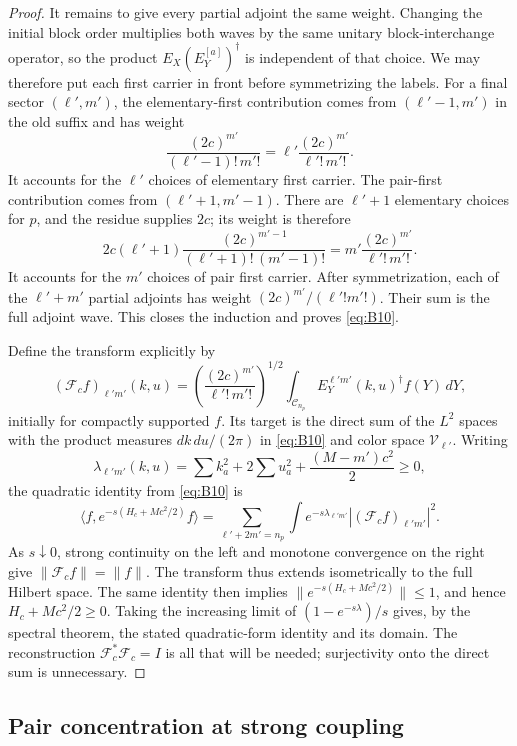 \begin{proof}
It remains to give every partial adjoint the same weight.  Changing
the initial block order multiplies both waves by the same unitary
block-interchange operator, so the product
\(E_X(E_Y^{[a]})^\dagger\) is independent of that choice.  We may
therefore put each first carrier in front before symmetrizing the
labels.  For a final sector \((\ell',m')\), the
elementary-first contribution comes from
\((\ell'-1,m')\) in the old suffix and has weight
\[
 \frac{(2c)^{m'}}{(\ell'-1)!\,m'!}
       =\ell'\frac{(2c)^{m'}}{\ell'!\,m'!}.
\]
It accounts for the \(\ell'\) choices of elementary first carrier.
The pair-first contribution comes from
\((\ell'+1,m'-1)\).  There are \(\ell'+1\) elementary choices
for \(p\), and the residue supplies \(2c\); its weight is therefore
\[
 2c(\ell'+1)
 \frac{(2c)^{m'-1}}{(\ell'+1)!\,(m'-1)!}
       =m'\frac{(2c)^{m'}}{\ell'!\,m'!}.
\]
It accounts for the \(m'\) choices of pair first carrier.
After symmetrization, each of the \(\ell'+m'\) partial adjoints has
weight \((2c)^{m'}/(\ell'!m'!)\).  Their sum is the full adjoint wave.
This closes the induction and proves \eqref{eq:B10}.

Define the transform explicitly by
\[
 (\mathcal F_c f)_{\ell'm'}(k,u)=
 \left(\frac{(2c)^{m'}}{\ell'!\,m'!}\right)^{1/2}
 \int_{\mathcal C_{n_p}}E_Y^{\ell'm'}(k,u)^\dagger f(Y)\,dY,
\]
initially for compactly supported \(f\).  Its target is the direct
sum of the \(L^2\) spaces with the product measures \(dk\,du/(2\pi)\)
in \eqref{eq:B10} and color space \(\mathcal V_{\ell'}\).
Writing
\[
 \lambda_{\ell'm'}(k,u)=
 \sum k_a^2+2\sum u_a^2+\frac{(M-m')c^2}{2}\geq0,
\]
the quadratic identity from \eqref{eq:B10} is
\[
 \langle f,e^{-s(H_c+Mc^2/2)}f\rangle
 =\sum_{\ell'+2m'=n_p}\int
       e^{-s\lambda_{\ell'm'}}|(\mathcal F_cf)_{\ell'm'}|^2.
\]
As \(s\downarrow0\), strong continuity on the left and monotone
convergence on the right give \(\|\mathcal F_cf\|=\|f\|\).
The transform thus extends isometrically to the full Hilbert
space.  The same identity then implies
\(\|e^{-s(H_c+Mc^2/2)}\|\leq1\), and hence
\(H_c+Mc^2/2\geq0\).  Taking the increasing limit of
\((1-e^{-s\lambda})/s\) gives, by the spectral theorem,
the stated quadratic-form identity and its domain.
The reconstruction \(\mathcal F_c^*\mathcal F_c=I\) is all that
will be needed; surjectivity onto the direct sum is unnecessary.
\end{proof}

\subsection{Pair concentration at strong coupling}
\label{subsec:bethe-strong-coupling}

